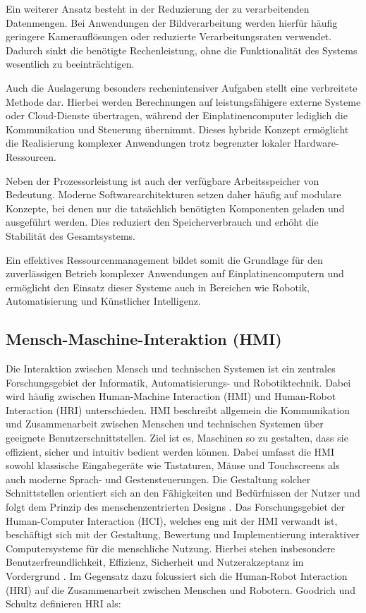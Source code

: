 Ein weiterer Ansatz besteht in der Reduzierung der zu verarbeitenden Datenmengen. Bei Anwendungen der Bildverarbeitung werden hierfür häufig geringere Kamerauflösungen oder reduzierte Verarbeitungsraten verwendet. Dadurch sinkt die benötigte Rechenleistung, ohne die Funktionalität des Systems wesentlich zu beeinträchtigen.

Auch die Auslagerung besonders rechenintensiver Aufgaben stellt eine verbreitete Methode dar. Hierbei werden Berechnungen auf leistungsfähigere externe Systeme oder Cloud-Dienste übertragen, während der Einplatinencomputer lediglich die Kommunikation und Steuerung übernimmt. Dieses hybride Konzept ermöglicht die Realisierung komplexer Anwendungen trotz begrenzter lokaler Hardware-Ressourcen.

Neben der Prozessorleistung ist auch der verfügbare Arbeitsspeicher von Bedeutung. Moderne Softwarearchitekturen setzen daher häufig auf modulare Konzepte, bei denen nur die tatsächlich benötigten Komponenten geladen und ausgeführt werden. Dies reduziert den Speicherverbrauch und erhöht die Stabilität des Gesamtsystems.

Ein effektives Ressourcenmanagement bildet somit die Grundlage für den zuverlässigen Betrieb komplexer Anwendungen auf Einplatinencomputern und ermöglicht den Einsatz dieser Systeme auch in Bereichen wie Robotik, Automatisierung und Künstlicher Intelligenz.

\subsection{Mensch-Maschine-Interaktion (HMI)}

Die Interaktion zwischen Mensch und technischen Systemen ist ein zentrales Forschungsgebiet der Informatik, Automatisierungs- und Robotiktechnik. Dabei wird häufig zwischen Human-Machine Interaction (HMI) und Human-Robot Interaction (HRI) unterschieden. HMI beschreibt allgemein die Kommunikation und Zusammenarbeit zwischen Menschen und technischen Systemen über geeignete Benutzerschnittstellen. Ziel ist es, Maschinen so zu gestalten, dass sie effizient, sicher und intuitiv bedient werden können. Dabei umfasst die HMI sowohl klassische Eingabegeräte wie Tastaturen, Mäuse und Touchscreens als auch moderne Sprach- und Gestensteuerungen. Die Gestaltung solcher Schnittstellen orientiert sich an den Fähigkeiten und Bedürfnissen der Nutzer und folgt dem Prinzip des menschenzentrierten Designs \cite{boy2011handbook}.
Das Forschungsgebiet der Human-Computer Interaction (HCI), welches eng mit der HMI verwandt ist, beschäftigt sich mit der Gestaltung, Bewertung und Implementierung interaktiver Computersysteme für die menschliche Nutzung. Hierbei stehen insbesondere Benutzerfreundlichkeit, Effizienz, Sicherheit und Nutzerakzeptanz im Vordergrund \cite{card1983psychology,hornbaek2025hci}.
Im Gegensatz dazu fokussiert sich die Human-Robot Interaction (HRI) auf die Zusammenarbeit zwischen Menschen und Robotern. Goodrich und Schultz definieren HRI als:

